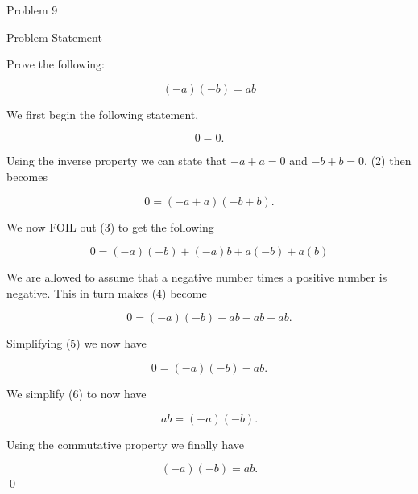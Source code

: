 \begin{problem}{Problem 9}
    \begin{statement}{Problem Statement}

        Prove the following:

        \setcounter{equation}{0}
        \begin{equation}
            (-a)(-b) = ab
        \end{equation}

    \end{statement}

    \begin{Highlight}[Solution]
        We first begin the following statement,

        \begin{equation}
            0 = 0.
        \end{equation}

        Using the inverse property we can state that $-a + a = 0$ and $-b + b = 0$, (2) then becomes

        \begin{equation}
            0 = (-a + a)(-b + b).
        \end{equation}

        We now FOIL out (3) to get the following

        \begin{equation}
            0 = (-a)(-b) + (-a)b + a(-b) + a(b)
        \end{equation}

        We are allowed to assume that a negative number times a positive number is negative. This in turn makes (4) become

        \begin{equation}
            0 = (-a)(-b) - ab - ab + ab.
        \end{equation}

        Simplifying (5) we now have

        \begin{equation}
            0 = (-a)(-b) - ab.
        \end{equation}

        We simplify (6) to now have

        \begin{equation}
            ab = (-a)(-b).
        \end{equation}

        Using the commutative property we finally have

        \begin{equation}
            (-a)(-b) = ab.
        \end{equation}
        \qed
    \end{Highlight}
\end{problem}

